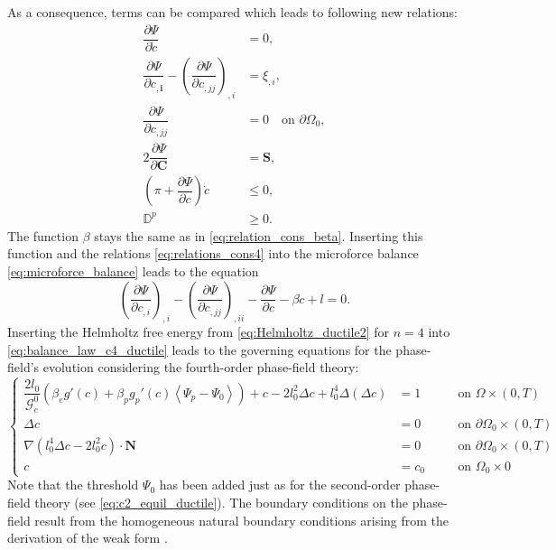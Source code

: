 As a consequence, terms can be compared which leads to following new relations:
\begin{equation} \label{eq:relations_cons4}
	\begin{aligned}
		\dfrac{\partial\Psi}{\partial\dot{c}} &= 0, \\
		\dfrac{\partial\Psi}{\partial c_{,\mathbf{i}}} -\left(\dfrac{\partial\Psi}{\partial c_{,jj}}\right)_{,i} &= \xi_{,i}, \\
		\dfrac{\partial\Psi}{\partial c_{,jj}} &= 0 \quad \text{on } \partial\Omega_{0}, \\
		2\dfrac{\partial\Psi}{\partial\mathbf{C}} &= \mathbf{S}, \\
		\left(\pi+\dfrac{\partial\Psi}{\partial c}\right)\dot{c} &\leq 0, \\
		\mathbb{D}^{p} &\geq 0.
	\end{aligned}
\end{equation}
The function $\beta$ stays the same as in \eqref{eq:relation_cons_beta}. Inserting this function and the relations \eqref{eq:relations_cons4} into the microforce balance \eqref{eq:microforce_balance} leads to the equation
\begin{equation} \label{eq:balance_law_c4_ductile}
	\left(\dfrac{\partial\Psi}{\partial c_{,i}}\right)_{,i}-\left(\dfrac{\partial\Psi}{\partial c_{,jj}}\right)_{,ii}-\dfrac{\partial\Psi}{\partial c}-\beta\dot{c}+l=0.
\end{equation}
Inserting the Helmholtz free energy from \eqref{eq:Helmholtz_ductile2} for $n=4$ into \eqref{eq:balance_law_c4_ductile} leads to the governing equations for the phase-field's evolution considering the fourth-order phase-field theory:
\begin{equation} \label{eq:c4_equil_ductile}
	\left\{\begin{alignedat}{2}
		\dfrac{2l_{0}}{\mathcal{G}_{c}^{0}}\left(\beta_{e}g'\left(c\right)+\beta_{p}g_{p}'\left(c\right)\left<\Psi_{p}-\Psi_{0}\right>\right) + c - 2l_{0}^{2}\Delta c +l_{0}^{4}\Delta\left(\Delta c\right) &= 1 && \quad\text{on } \Omega\times\left(0,T\right) \\
		\Delta c &= 0 && \quad \text{on } \partial\Omega_{0}\times\left(0,T\right) \\
		\nabla\left(l_{0}^{4}\Delta c-2l_{0}^{2}c\right)\cdot\mathbf{N} &= 0 && \quad \text{on } \partial\Omega_{0}\times\left(0,T\right) \\
c &= c_{0} && \quad \text{on } \Omega_{0}\times0  
	\end{alignedat}\right.
\end{equation}
Note that the threshold $\Psi_{0}$ has been added just as for the second-order phase-field theory (see \eqref{eq:c2_equil_ductile}). The boundary conditions on the phase-field result from the homogeneous natural boundary conditions arising from the derivation of the weak form \citep{11_PF_DissBorden}.

